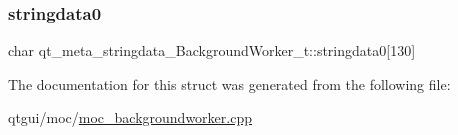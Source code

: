 \subsubsection{\texorpdfstring{stringdata0}{stringdata0}}
{\footnotesize\ttfamily char qt\+\_\+meta\+\_\+stringdata\+\_\+\+Background\+Worker\+\_\+t\+::stringdata0\mbox{[}130\mbox{]}}



The documentation for this struct was generated from the following file\+:\begin{DoxyCompactItemize}
\item 
qtgui/moc/\mbox{\hyperlink{moc__backgroundworker_8cpp}{moc\+\_\+backgroundworker.\+cpp}}\end{DoxyCompactItemize}
